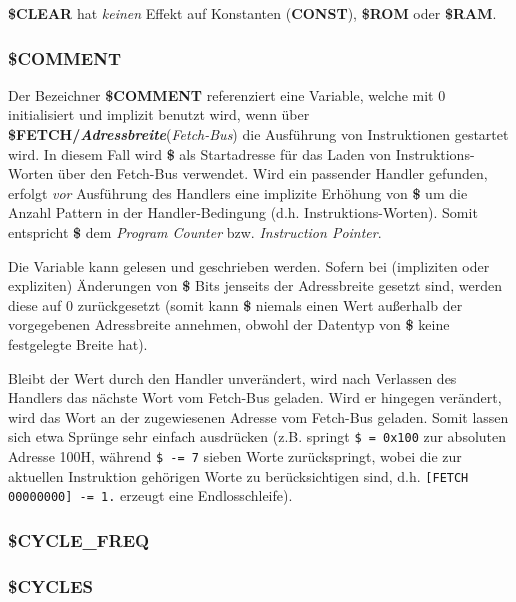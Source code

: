\documentclass{scrartcl}
\begin{document}
\vspace{10pt}
\noindent \textbf{\$CLEAR} hat \textit{keinen} Effekt auf Konstanten (\textbf{CONST}), \textbf{\$ROM} oder \textbf{\$RAM}.

\subsubsection{\$COMMENT}

\noindent Der Bezeichner \textbf{\$COMMENT} referenziert eine Variable, welche mit 0 initialisiert und implizit benutzt wird, wenn über \textbf{\$FETCH/\textit{Adressbreite}}(\textit{Fetch-Bus}) die Ausführung von Instruktionen gestartet wird. In diesem Fall wird \textbf{\$} als Startadresse für das Laden von Instruktions-Worten über den Fetch-Bus verwendet. Wird ein passender Handler gefunden, erfolgt \textit{vor} Ausführung des Handlers eine implizite Erhöhung von \textbf{\$} um die Anzahl Pattern in der Handler-Bedingung (d.h. Instruktions-Worten). Somit entspricht \textbf{\$} dem \textit{Program Counter} bzw. \textit{Instruction Pointer}.

\vspace{10pt}
\noindent Die Variable kann gelesen und geschrieben werden. Sofern bei (impliziten oder expliziten) Änderungen von \textbf{\$} Bits jenseits der Adressbreite gesetzt sind, werden diese auf 0 zurückgesetzt (somit kann \textbf{\$} niemals einen Wert außerhalb der vorgegebenen Adressbreite annehmen, obwohl der Datentyp von \textbf{\$} keine festgelegte Breite hat).

\vspace{10pt}
\noindent Bleibt der Wert durch den Handler unverändert, wird nach Verlassen des Handlers das nächste Wort vom Fetch-Bus geladen. Wird er hingegen verändert, wird das Wort an der zugewiesenen Adresse vom Fetch-Bus geladen. Somit lassen sich etwa Sprünge sehr einfach ausdrücken (z.B. springt \texttt{\$~=~0x100} zur absoluten Adresse 100H, während \texttt{\$~-=~7} sieben Worte zurückspringt, wobei die zur aktuellen Instruktion gehörigen Worte zu berücksichtigen sind, d.h. \texttt{[FETCH 00000000]~-=~1.} erzeugt eine Endlosschleife).

\subsubsection{\$CYCLE\_FREQ}

\subsubsection{\$CYCLES}
\end{document}
